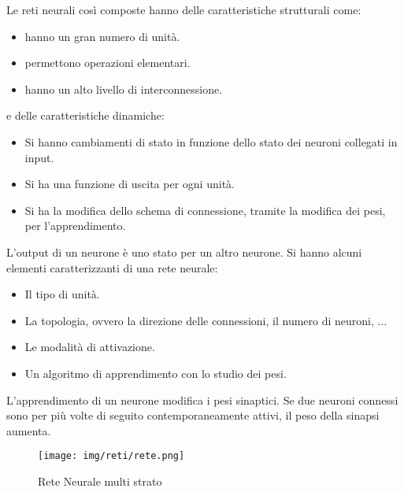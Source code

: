 Le reti neurali così composte hanno delle caratteristiche strutturali come:
\begin{itemize}
    \item hanno un gran numero di unità.
    \item permettono operazioni elementari.
    \item hanno un alto livello di interconnessione.
\end{itemize}
e delle caratteristiche dinamiche:
\begin{itemize}
    \item Si hanno cambiamenti di stato in funzione dello stato dei neuroni collegati in input.
    \item Si ha una funzione di uscita per ogni unità.
    \item Si ha la modifica dello schema di connessione, tramite la modifica dei pesi, per l'apprendimento.
\end{itemize}

L'output di un neurone è uno stato per un altro neurone. Si hanno alcuni elementi caratterizzanti di una rete neurale:
\begin{itemize}
    \item Il tipo di unità.
    \item La topologia, ovvero la direzione delle connessioni, il numero di neuroni, $\dots$
    \item Le modalità di attivazione.
    \item Un algoritmo di apprendimento con lo studio dei pesi. 
\end{itemize}

L'apprendimento di un neurone modifica i pesi sinaptici. Se due neuroni connessi sono per più volte di seguito contemporaneamente attivi, il peso della sinapsi aumenta.
\begin{figure}[!ht]
    \centering
    \texttt{[image: img/reti/rete.png]}
    \caption{Rete Neurale multi strato}
\end{figure}

